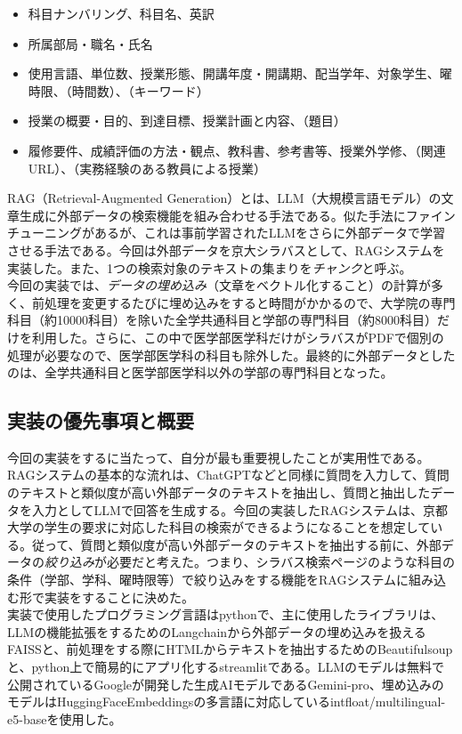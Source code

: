 \begin{itemize}
  \item 科目ナンバリング、科目名、英訳
  \item 所属部局・職名・氏名
  \item 使用言語、単位数、授業形態、開講年度・開講期、配当学年、対象学生、曜時限、（時間数）、（キーワード）
  \item 授業の概要・目的、到達目標、授業計画と内容、（題目）
  \item 履修要件、成績評価の方法・観点、教科書、参考書等、授業外学修、（関連URL）、（実務経験のある教員による授業）
\end{itemize}

RAG（Retrieval-Augmented Generation）とは、LLM（大規模言語モデル）の文章生成に外部データの検索機能を組み合わせる手法である。似た手法にファインチューニングがあるが、これは事前学習されたLLMをさらに外部データで学習させる手法である。今回は外部データを京大シラバスとして、RAGシステムを実装した。また、1つの検索対象のテキストの集まりを\emph{チャンク}と呼ぶ。\\

今回の実装では、\emph{データの埋め込み}（文章をベクトル化すること）の計算が多く、前処理を変更するたびに埋め込みをすると時間がかかるので、大学院の専門科目（約10000科目）を除いた全学共通科目と学部の専門科目（約8000科目）だけを利用した。さらに、この中で医学部医学科だけがシラバスがPDFで個別の処理が必要なので、医学部医学科の科目も除外した。最終的に外部データとしたのは、全学共通科目と医学部医学科以外の学部の専門科目となった。\\

\subsection{実装の優先事項と概要}
今回の実装をするに当たって、自分が最も重要視したことが実用性である。RAGシステムの基本的な流れは、ChatGPTなどと同様に質問を入力して、質問のテキストと類似度が高い外部データのテキストを抽出し、質問と抽出したデータを入力としてLLMで回答を生成する。今回の実装したRAGシステムは、京都大学の学生の要求に対応した科目の検索ができるようになることを想定している。従って、質問と類似度が高い外部データのテキストを抽出する前に、外部データの\emph{絞り込み}が必要だと考えた。つまり、シラバス検索ページのような科目の条件（学部、学科、曜時限等）で絞り込みをする機能をRAGシステムに組み込む形で実装をすることに決めた。\\

実装で使用したプログラミング言語はpythonで、主に使用したライブラリは、LLMの機能拡張をするためのLangchainから外部データの埋め込みを扱えるFAISSと、前処理をする際にHTMLからテキストを抽出するためのBeautifulsoupと、python上で簡易的にアプリ化するstreamlitである。LLMのモデルは無料で公開されているGoogleが開発した生成AIモデルであるGemini-pro、埋め込みのモデルはHuggingFaceEmbeddingsの多言語に対応しているintfloat/multilingual-e5-baseを使用した。\\

